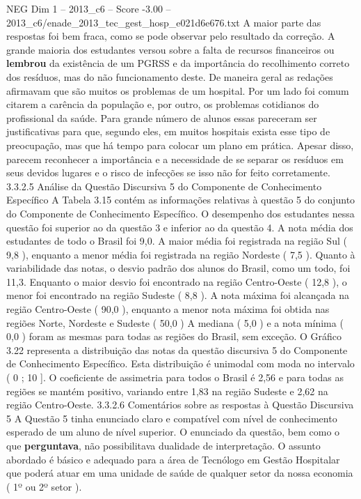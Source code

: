 \begin{textsample}{NEG Dim 1 – 2013\_c6 – Score -3.00 – 2013\_c6/enade\_2013\_tec\_gest\_hosp\_e021d6e676.txt}
A maior parte das respostas foi bem fraca, como se pode observar pelo resultado da correção.
A grande maioria dos estudantes versou sobre a falta de recursos financeiros ou \textbf{lembrou} da existência de um PGRSS e da importância do recolhimento correto dos resíduos, mas do não funcionamento deste.
De maneira geral as redações afirmavam que são muitos os problemas de um hospital.
Por um lado foi comum citarem a carência da população e, por outro, os problemas cotidianos do profissional da saúde.
Para grande número de alunos essas pareceram ser justificativas para que, segundo eles, em muitos hospitais exista esse tipo de preocupação, mas que há tempo para colocar um plano em prática.
Apesar disso, parecem reconhecer a importância e a necessidade de se separar os resíduos em seus devidos lugares e o risco de infecções se isso não for feito corretamente. 3.3.2.5 Análise da Questão Discursiva 5 do Componente de Conhecimento Específico A Tabela 3.15 contém as informações relativas à questão 5 do conjunto do Componente de Conhecimento Específico.
O desempenho dos estudantes nessa questão foi superior ao da questão 3 e inferior ao da questão 4.
A nota média dos estudantes de todo o Brasil foi 9,0.
A maior média foi registrada na região Sul ( 9,8 ), enquanto a menor média foi registrada na região Nordeste ( 7,5 ).
Quanto à variabilidade das notas, o desvio padrão dos alunos do Brasil, como um todo, foi 11,3.
Enquanto o maior desvio foi encontrado na região Centro-Oeste ( 12,8 ), o menor foi encontrado na região Sudeste ( 8,8 ).
A nota máxima foi alcançada na região Centro-Oeste ( 90,0 ), enquanto a menor nota máxima foi obtida nas regiões Norte, Nordeste e Sudeste ( 50,0 ) A mediana ( 5,0 ) e a nota mínima ( 0,0 ) foram as mesmas para todas as regiões do Brasil, sem exceção.
O Gráfico 3.22 representa a distribuição das notas da questão discursiva 5 do Componente de Conhecimento Específico.
Esta distribuição é unimodal com moda no intervalo ( 0 ; 10 ].
O coeficiente de assimetria para todos o Brasil é 2,56 e para todas as regiões se mantém positivo, variando entre 1,83 na região Sudeste e 2,62 na região Centro-Oeste. 3.3.2.6 Comentários sobre as respostas à Questão Discursiva 5 A Questão 5 tinha enunciado claro e compatível com nível de conhecimento esperado de um aluno de nível superior.
O enunciado da questão, bem como o que \textbf{perguntava}, não possibilitava dualidade de interpretação.
O assunto abordado é básico e adequado para a área de Tecnólogo em Gestão Hospitalar que poderá atuar em uma unidade de saúde de qualquer setor da nossa economia ( 1º ou 2º setor ).

\end{textsample}
